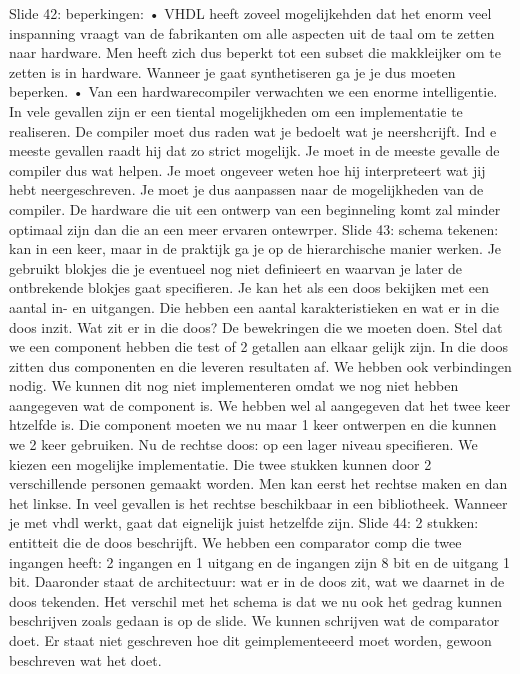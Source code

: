 \documentclass[10pt,a4paper]{book}
\begin{document}
Slide 42: beperkingen:
	• VHDL heeft zoveel mogelijkehden dat het enorm veel inspanning vraagt van de fabrikanten om alle aspecten uit de taal om te zetten naar hardware. Men heeft zich dus beperkt tot een subset die makkleijker om te zetten is in hardware. Wanneer je gaat synthetiseren ga je je dus moeten beperken.
	• Van een hardwarecompiler verwachten we een enorme intelligentie. In vele gevallen zijn er een tiental mogelijkheden om een implementatie te realiseren. De compiler moet dus raden wat je bedoelt wat je neershcrijft. Ind e meeste gevallen raadt hij dat zo strict mogelijk. Je moet in de meeste gevalle de compiler dus wat helpen. Je moet ongeveer weten hoe hij interpreteert wat jij hebt neergeschreven. Je moet je dus aanpassen naar de mogelijkheden van de compiler. De hardware die uit een ontwerp van een beginneling komt zal minder optimaal zijn dan die an een meer ervaren ontewrper.
Slide 43: schema tekenen: kan in een keer, maar in de praktijk ga je op de hierarchische manier werken. Je gebruikt blokjes die je eventueel nog niet definieert en waarvan je later de ontbrekende blokjes gaat specifieren. Je kan het als een doos bekijken met een aantal in- en uitgangen. Die hebben een aantal karakteristieken en wat er in die doos inzit. Wat zit er in die doos? De bewekringen die we moeten doen. Stel dat we een component hebben die test of 2 getallen aan elkaar gelijk zijn. In die doos zitten dus componenten en die leveren resultaten af. We hebben ook verbindingen nodig.
We kunnen dit nog niet implementeren omdat we nog niet hebben aangegeven wat de component is. We hebben wel al aangegeven dat het twee keer htzelfde is. Die component moeten we nu maar 1 keer ontwerpen en die kunnen we 2 keer gebruiken.
Nu de rechtse doos: op een lager niveau specifieren. We kiezen een mogelijke implementatie. Die twee stukken kunnen door 2 verschillende personen gemaakt worden. Men kan eerst het rechtse maken en dan het linkse. In veel gevallen is het rechtse beschikbaar in een bibliotheek.
Wanneer je met vhdl werkt, gaat dat eignelijk juist hetzelfde zijn.
Slide 44: 2 stukken: entitteit die de doos beschrijft. We hebben een comparator comp die twee ingangen heeft: 2 ingangen en 1 uitgang en de ingangen zijn 8 bit en de uitgang 1 bit.
Daaronder staat de architectuur: wat er in de doos zit, wat we daarnet in de doos tekenden.
Het verschil met het schema is dat we nu ook het gedrag kunnen beschrijven zoals gedaan is op de slide. We kunnen schrijven wat de comparator doet. Er staat niet geschreven hoe dit geimplementeeerd moet worden, gewoon beschreven wat het doet. 
\end{document}
